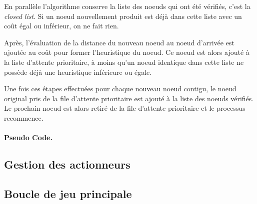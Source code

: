 \documentclass[a4paper,10pt]{report}
\theoremstyle{definition}
\begin{document}
\begin{spacing}{1.5}
En parallèle l'algorithme conserve la liste des noeuds qui ont été vérifiés,
c'est la \textit{closed list}. Si un noeud nouvellement produit est déjà dans
cette liste avec un coût égal ou inférieur, on ne fait rien.

Après, l'évaluation de la distance du nouveau noeud au noeud d'arrivée est ajoutée
au coût pour former l'heuristique du noeud. Ce noeud est alors ajouté à la liste
d'attente prioritaire, à moins qu'un noeud identique dans cette liste ne possède
déjà une heuristique inférieure ou égale.

Une fois ces étapes effectuées pour chaque nouveau noeud contigu, le noeud
original pris de la file d'attente prioritaire est ajouté à la liste des noeuds
vérifiés. Le prochain noeud est alors retiré de la file d'attente prioritaire et
le processus recommence.

\paragraph{Pseudo Code.}

\subsection{Gestion des actionneurs}
\subsection{Boucle de jeu principale}
\newpage
\end{spacing}
\end{document}
